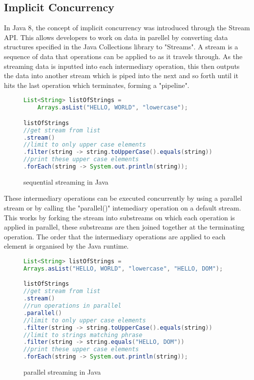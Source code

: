 \documentclass[]{report}
\begin{document}
\subsection{Implicit Concurrency}

In Java 8, the concept of implicit concurrency was introduced through the Stream API. This allows developers to work on data in parellel by converting data structures specified in the Java Collections library to "Streams". A stream is a sequence of data that operations can be applied to as it travels through. As the streaming data is inputted into each intermediary operation, this then outputs the data into another stream which is piped into the next and so forth until it hits the last operation which terminates, forming a "pipeline". \cite{Stream API} 

\begin{figure}[h!]
\caption{sequential streaming in Java}
\begin{lstlisting}[language=Java,frame=single]
List<String> listOfStrings = 
	Arrays.asList("HELLO, WORLD", "lowercase");

listOfStrings
//get stream from list
.stream()
//limit to only upper case elements
.filter(string -> string.toUpperCase().equals(string))
//print these upper case elements
.forEach(string -> System.out.println(string));
\end{lstlisting}
\end{figure}

These intermediary operations can be executed concurrently by using a parallel stream or by calling the "parallel()" intemediary operation on a default stream. This works by forking the stream into substreams on which each operation is applied in parallel, these substreams are then joined together at the terminating operation. The order that the intermediary operations are applied to each element is organised by the Java runtime.\cite{Stream API}

\begin{figure}[h!]
\caption{parallel streaming in Java}
\begin{lstlisting}[language=Java,frame=single]
List<String> listOfStrings = 
Arrays.asList("HELLO, WORLD", "lowercase", "HELLO, DOM");

listOfStrings
//get stream from list
.stream()
//run operations in parallel
.parallel()
//limit to only upper case elements
.filter(string -> string.toUpperCase().equals(string))
//limit to strings matching phrase
.filter(string -> string.equals("HELLO, DOM"))
//print these upper case elements
.forEach(string -> System.out.println(string));
\end{lstlisting}
\end{figure}
\end{document}
